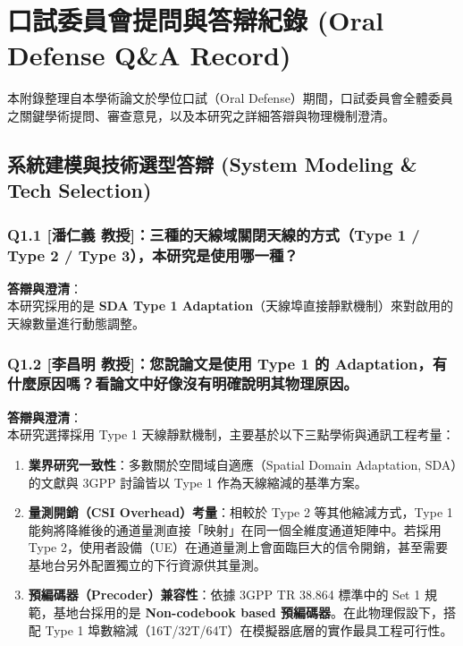 \chapter{口試委員會提問與答辯紀錄 (Oral Defense Q\&A Record)}
\label{appendix:B}

本附錄整理自本學術論文於學位口試（Oral Defense）期間，口試委員會全體委員之關鍵學術提問、審查意見，以及本研究之詳細答辯與物理機制澄清。

\section{系統建模與技術選型答辯 (System Modeling \& Tech Selection)}

\subsection*{Q1.1 [潘仁義 教授]：三種的天線域關閉天線的方式（Type 1 / Type 2 / Type 3），本研究是使用哪一種？}
\textbf{答辯與澄清}：\\
本研究採用的是 \textbf{SDA Type 1 Adaptation}（天線埠直接靜默機制）來對啟用的天線數量進行動態調整。

\subsection*{Q1.2 [李昌明 教授]：您說論文是使用 Type 1 的 Adaptation，有什麼原因嗎？看論文中好像沒有明確說明其物理原因。}
\textbf{答辯與澄清}：\\
本研究選擇採用 Type 1 天線靜默機制，主要基於以下三點學術與通訊工程考量：
\begin{enumerate}
    \item \textbf{業界研究一致性}：多數關於空間域自適應（Spatial Domain Adaptation, SDA）的文獻與 3GPP 討論皆以 Type 1 作為天線縮減的基準方案。
    \item \textbf{量測開銷（CSI Overhead）考量}：相較於 Type 2 等其他縮減方式，Type 1 能夠將降維後的通道量測直接「映射」在同一個全維度通道矩陣中。若採用 Type 2，使用者設備（UE）在通道量測上會面臨巨大的信令開銷，甚至需要基地台另外配置獨立的下行資源供其量測。
    \item \textbf{預編碼器（Precoder）兼容性}：依據 3GPP TR 38.864 標準中的 Set 1 規範，基地台採用的是 \textbf{Non-codebook based 預編碼器}。在此物理假設下，搭配 Type 1 埠數縮減（16T/32T/64T）在模擬器底層的實作最具工程可行性。
\end{enumerate}

